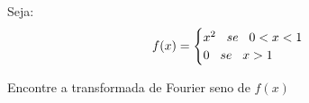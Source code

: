 \linespread{1.5}
\linespread{1.5}
Seja:
\begin{equation*}
    f(x) = \begin{cases}
    x^2 \hspace{0.3cm} se \hspace{0.3cm} 0 < x < 1\\
    0 \hspace{0.3cm} se \hspace{0.3cm} x > 1
    \end{cases}
\end{equation*}

Encontre a transformada de Fourier seno de $f(x)$